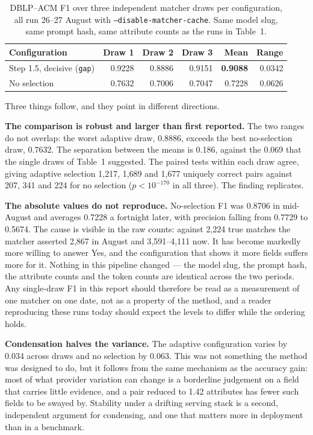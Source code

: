 \documentclass[11pt]{article}
\begin{document}
\begin{table}[h]
\centering
\begin{tabular}{lrrrrr}
\toprule
Configuration & Draw 1 & Draw 2 & Draw 3 & Mean & Range \\
\midrule
Step 1.5, decisive (\texttt{gap}) & 0.9228 & 0.8886 & 0.9151 & \textbf{0.9088} & 0.0342 \\
No selection                      & 0.7632 & 0.7006 & 0.7047 & 0.7228 & 0.0626 \\
\bottomrule
\end{tabular}
\caption{DBLP--ACM F1 over three independent matcher draws per configuration, all run
26--27 August with \texttt{--disable-matcher-cache}. Same model slug, same prompt hash,
same attribute counts as the runs in Table~1.}
\label{tab:draws}
\end{table}

Three things follow, and they point in different directions.

\textbf{The comparison is robust and larger than first reported.} The two ranges do not
overlap: the worst adaptive draw, 0.8886, exceeds the best no-selection draw, 0.7632. The
separation between the means is 0.186, against the 0.069 that the single draws of Table~1
suggested. The paired tests within each draw agree, giving adaptive selection 1{,}217, 1{,}689
and 1{,}677 uniquely correct pairs against 207, 341 and 224 for no selection
($p < 10^{-170}$ in all three). The finding replicates.

\textbf{The absolute values do not reproduce.} No-selection F1 was 0.8706 in mid-August and
averages 0.7228 a fortnight later, with precision falling from 0.7729 to 0.5674. The cause
is visible in the raw counts: against 2{,}224 true matches the matcher asserted 2{,}867 in
August and 3{,}591--4{,}111 now. It has become markedly more willing to answer Yes, and the
configuration that shows it more fields suffers more for it. Nothing in this pipeline
changed --- the model slug, the prompt hash, the attribute counts and the token counts are
identical across the two periods. Any single-draw F1 in this report should therefore be read
as a measurement of one matcher on one date, not as a property of the method, and a reader
reproducing these runs today should expect the levels to differ while the ordering holds.

\textbf{Condensation halves the variance.} The adaptive configuration varies by 0.034 across
draws and no selection by 0.063. This was not something the method was designed to do, but it
follows from the same mechanism as the accuracy gain: most of what provider variation can
change is a borderline judgement on a field that carries little evidence, and a pair reduced
to 1.42 attributes has fewer such fields to be swayed by. Stability under a drifting
serving stack is a second, independent argument for condensing, and one that matters more in
deployment than in a benchmark.
\end{document}
